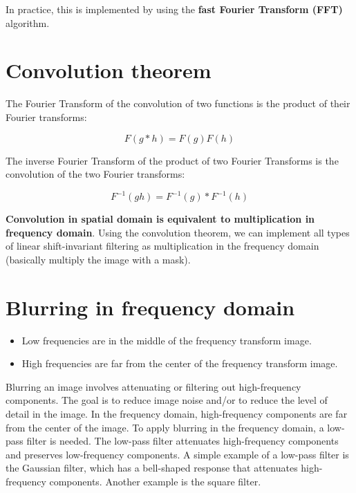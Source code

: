 \documentclass{article}
\begin{document}
In practice, this is implemented by using the \textbf{fast Fourier Transform (FFT)} algorithm.

\newpage

\section*{Convolution theorem}

The Fourier Transform of the convolution of two functions is the product of their Fourier transforms:

\begin{equation*}
    F(g * h) = F(g)F(h)
\end{equation*}

The inverse Fourier Transform of the product of two Fourier Transforms is the convolution of the two Fourier transforms:

\begin{equation*}
    F^{-1}(gh) = F^{-1}(g) * F^{-1}(h)
\end{equation*}

\textbf{Convolution in spatial domain is equivalent to multiplication in frequency domain}. Using the convolution theorem, we can implement all types of linear shift-invariant filtering as multiplication in the frequency domain (basically multiply the image with a mask).

\section*{Blurring in frequency domain}

\begin{itemize}
    \item Low frequencies are in the middle of the frequency transform image.
    \item High frequencies are far from the center of the frequency transform image. 
\end{itemize}

Blurring an image involves attenuating or filtering out high-frequency components. The goal is to reduce image noise and/or to reduce the level of detail in the image. In the frequency domain, high-frequency components are far from the center of the image. To apply blurring in the frequency domain, a low-pass filter is needed. The low-pass filter attenuates high-frequency components and preserves low-frequency components. A simple example of a low-pass filter is the Gaussian filter, which has a bell-shaped response that attenuates high-frequency components. Another example is the square filter.
\end{document}
